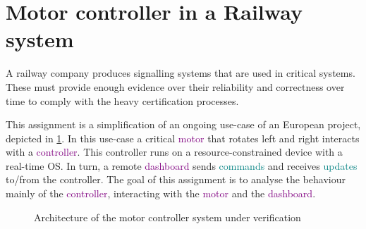 \documentclass[11pt]{article}
\begin{document}
\newcommand{\compn}[1]{\textsf{\textcolor{purple}{#1}}\xspace}
\newcommand{\chn}[1]{\textsf{\textcolor{teal}{#1}}\xspace}

\section*{Motor controller in a Railway system}

A railway company produces signalling systems that are used in critical systems. These must provide enough evidence over their reliability and correctness over time to comply with the heavy certification processes.

This assignment is a simplification of an ongoing use-case of an European project, depicted in \cref{fig:global-architecture}.
In this use-case a critical \compn{motor} that rotates left and right interacts with a \compn{controller}. This controller runs on a resource-constrained device with a real-time OS. In turn, a remote \compn{dashboard} sends \chn{commands} and receives \chn{updates} to/from the controller. The goal of this assignment is to analyse the behaviour mainly of the \compn{controller}, interacting with the \compn{motor} and the \compn{dashboard}.

\begin{figure}[tb]
  \centering
  \caption{Architecture of the motor controller system under verification}
  \label{fig:global-architecture}
\end{figure}
\end{document}

